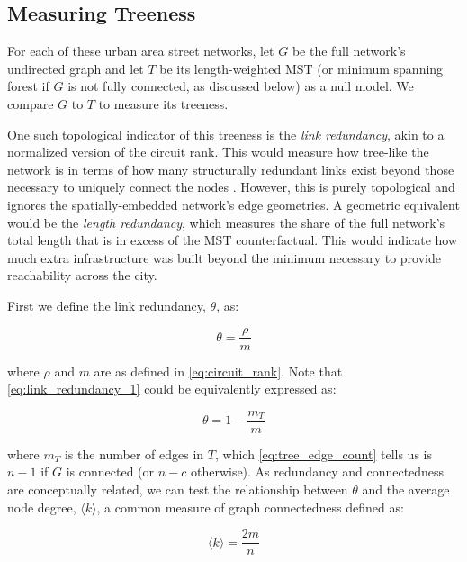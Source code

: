 \documentclass[12pt,letterpaper]{article} %
\begin{document}
\subsection{Measuring Treeness}

For each of these urban area street networks, let $G$ be the full network's undirected graph and let $T$ be its length-weighted MST (or minimum spanning forest if $G$ is not fully connected, as discussed below) as a null model. We compare $G$ to $T$ to measure its treeness.

One such topological indicator of this treeness is the \textit{link redundancy}, akin to a normalized version of the circuit rank. This would measure how tree-like the network is in terms of how many structurally redundant links exist beyond those necessary to uniquely connect the nodes \citep{buhl_2006_topological}. However, this is purely topological and ignores the spatially-embedded network's edge geometries. A geometric equivalent would be the \textit{length redundancy}, which measures the share of the full network's total length that is in excess of the MST counterfactual. This would indicate how much extra infrastructure was built beyond the minimum necessary to provide reachability across the city.

First we define the link redundancy, $\theta$, as:

\begin{equation}
  \label{eq:link_redundancy_1}
  \theta = \frac{\rho}{m}
\end{equation}

where $\rho$ and $m$ are as defined in \autoref{eq:circuit_rank}. Note that \autoref{eq:link_redundancy_1} could be equivalently expressed as:

\begin{equation}
  \label{eq:link_redundancy_2}
  \theta = 1 - \frac{m_T}{m}
\end{equation}

where $m_T$ is the number of edges in $T$, which \autoref{eq:tree_edge_count} tells us is $n - 1$ if $G$ is connected (or $n - c$ otherwise). As redundancy and connectedness are conceptually related, we can test the relationship between $\theta$ and the average node degree, $\langle k \rangle$, a common measure of graph connectedness defined as:

\begin{equation}
  \label{eq:avg_node_degree}
  \langle k \rangle = \frac{2m}{n}
\end{equation}
\end{document}
